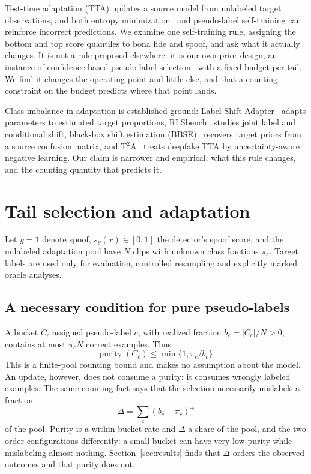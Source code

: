 \documentclass[10pt,letterpaper]{article}
\begin{document}
Test-time adaptation (TTA) updates a source model from unlabeled target
observations, and both entropy minimization~\cite{tent} and pseudo-label
self-training can reinforce incorrect predictions. We examine one self-training
rule, assigning the bottom and top score quantiles to bona fide and spoof, and
ask what it actually changes. It is not a rule proposed elsewhere: it is our
own prior design, an instance of confidence-based pseudo-label
selection~\cite{fixmatch,shot} with a fixed budget per tail. We find it changes
the operating point and little else, and that a counting constraint on the
budget predicts where that point lands.

Class imbalance in adaptation is established ground: Label Shift
Adapter~\cite{lsa} adapts parameters to estimated target proportions,
RLSbench~\cite{rlsbench} studies joint label and conditional shift, black-box
shift estimation (BBSE)~\cite{bbse} recovers target priors from a source
confusion matrix, and T$^2$A~\cite{t2a} treats deepfake TTA by
uncertainty-aware negative learning. Our claim is narrower and empirical: what
this rule changes, and the counting quantity that predicts it.

\section{Tail selection and adaptation}
\label{sec:method}
Let $y=1$ denote spoof, $s_\theta(x)\in[0,1]$ the detector's spoof score, and
the unlabeled adaptation pool have $N$ clips with unknown class fractions
$\pi_c$. Target labels are used only for evaluation, controlled resampling and
explicitly marked oracle analyses.

\subsection{A necessary condition for pure pseudo-labels}
A bucket $C_c$ assigned pseudo-label $c$, with realized fraction
$b_c=|C_c|/N>0$, contains at most $\pi_c N$ correct examples. Thus
\begin{equation}
 \operatorname{purity}(C_c)\leq\min\{1,\pi_c/b_c\}.
 \label{eq:bound}
\end{equation}
This is a finite-pool counting bound and makes no assumption about the model.
An update, however, does not consume a purity: it consumes wrongly labeled
examples. The same counting fact says that the selection necessarily mislabels
a fraction
\begin{equation}
 \Delta=\sum_c(b_c-\pi_c)^{+}
 \label{eq:excess}
\end{equation}
of the pool. Purity is a within-bucket rate and $\Delta$ a share of the pool,
and the two order configurations differently: a small bucket can have very low
purity while mislabeling almost nothing. Section~\ref{sec:results} finds that
$\Delta$ orders the observed outcomes and that purity does not.
\end{document}

